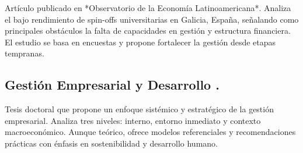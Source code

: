 Artículo publicado en *Observatorio de la Economía Latinoamericana*. Analiza el bajo rendimiento de spin-offs universitarias en Galicia, España, señalando como principales obstáculos la falta de capacidades en gestión y estructura financiera. El estudio se basa en encuestas y propone fortalecer la gestión desde etapas tempranas.

\subsection{Gestión Empresarial y Desarrollo \cite{Reyes12}.}

Tesis doctoral que propone un enfoque sistémico y estratégico de la gestión empresarial. Analiza tres niveles: interno, entorno inmediato y contexto macroeconómico. Aunque teórico, ofrece modelos referenciales y recomendaciones prácticas con énfasis en sostenibilidad y desarrollo humano.




